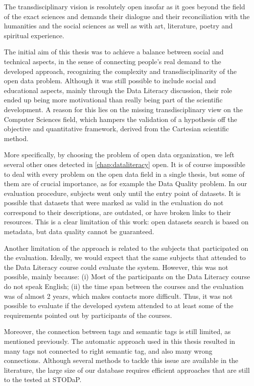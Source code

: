 \begin{citacao}
The transdisciplinary vision is resolutely open insofar as it goes beyond the field of the exact sciences and demands their dialogue and their reconciliation with the humanities and the social sciences as well as with art, literature, poetry and spiritual experience. \cite[Article 5]{Freitas1994}
\end{citacao}

The initial aim of this thesis was to achieve a balance between social and technical aspects, in the sense of connecting people's real demand to the developed approach, recognizing the complexity and transdisciplinarity of the open data problem.
Although it was still possible to include social and educational aspects, mainly through the Data Literacy discussion, their role ended up being more motivational than really being part of the scientific development.
A reason for this lies on the missing transdisciplinary view on the Computer Sciences field, which hampers the validation of a hypothesis off the objective and quantitative framework, derived from the Cartesian scientific method.

More specifically, by choosing the problem of open data organization, we left several other ones detected in \autoref{chap:dataliteracy} open.
It is of course impossible to deal with every problem on the open data field in a single thesis, but some of them are of crucial importance, as for example the Data Quality problem.
In our evaluation procedure, subjects went only until the entry point of datasets.
It is possible that datasets that were marked as valid in the evaluation do not correspond to their descriptions, are outdated, or have broken links to their resources.
This is a clear limitation of this work: open datasets search is based on metadata, but data quality cannot be guaranteed.

Another limitation of the approach is related to the subjects that participated on the evaluation.
Ideally, we would expect that the same subjects that attended to the Data Literacy course could evaluate the system.
However, this was not possible, mainly because: (i) Most of the participants on the Data Literacy course do not speak English; (ii) the time span between the courses and the evaluation was of almost 2 years, which makes contacts more difficult.
Thus, it was not possible to evaluate if the developed system attended to at least some of the requirements pointed out by participants of the courses.

Moreover, the connection between tags and semantic tags is still limited, as mentioned previously.
The automatic approach used in this thesis resulted in many tags not connected to right semantic tag, and also many wrong connections. 
Although several methods to tackle this issue are available in the literature, the large size of our database requires efficient approaches that are still to the tested at STODaP.

